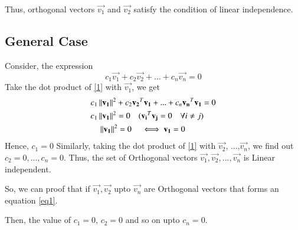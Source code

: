\documentclass[journal,12pt,twocolumn]{IEEEtran}
\begin{document}
Thus, orthogonal vectors $\vec{v_1}$ and $\vec{v_2}$ satisfy the condition of linear independence.
\subsection{General Case}
Consider, the expression
\begin{equation}\label{1}
c_1\vec{v_1} + c_2\vec{v_2} + ... + c_n\vec{v_n} = 0
\end{equation}
Take the dot product of \ref{1} with $\vec{v_1}$, we get
\begin{align}
&	c_1\left\lVert\mathbf{v_1}\right\rVert^2 + c_2\mathbf{v_2}^T\mathbf{v_1} + ... + c_n\mathbf{v_n}^T\mathbf{v_1} = 0 \\
&   c_1\left\lVert\mathbf{v_1}\right\rVert^2 = 0 \quad (\mathbf{v_i}^T\mathbf{v_j}=0 \quad \forall i\not=j)\\
& \quad \left\lVert\mathbf{v_1}\right\rVert^2 = 0 \quad \iff \mathbf{v_1} = 0 
\end{align}
Hence, $c_1 = 0$
Similarly, taking the dot product of \ref{1} with $\vec{v_2}$, ...,$\vec{v_n}$, we find out $c_2 =0, ...,c_n=0$.
Thus, the set of Orthogonal vectors $\vec{v_1},\vec{v_2},...,\vec{v_n}$ is Linear independent.

So, we can proof that if $\vec{v_1} ,\vec{v_2}$ upto $\vec{v_n}$ are Orthogonal vectors that forms an equation \eqref{eq1}.

Then, the value of $c_1=0$, $c_2=0$ and so on upto $c_n=0$.
\end{document}
